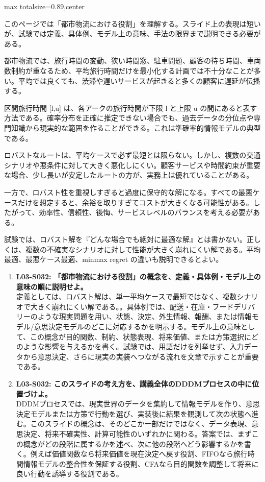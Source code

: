 \begin{minipage}[t]{0.58\textwidth}
\begin{adjustbox}{max totalsize={\textwidth}{0.89\textheight},center}
\begin{minipage}{\textwidth}\scriptsize
{}このページでは「都市物流における役割」を理解する。スライド上の表現は短いが、試験では定義、具体例、モデル上の意味、手法の限界まで説明できる必要がある。\par
都市物流では、旅行時間の変動、狭い時間窓、駐車問題、顧客の待ち時間、車両数制約が重なるため、平均旅行時間だけを最小化する計画では不十分なことが多い。平均では良くても、渋滞や遅いサービスが起きると多くの顧客に遅延が伝播する。\par
区間旅行時間 [l,u] は、各アークの旅行時間が下限 l と上限 u の間にあると表す方法である。確率分布を正確に推定できない場合でも、過去データの分位点や専門知識から現実的な範囲を作ることができる。これは準確率的情報モデルの典型である。\par
ロバストなルートは、平均ケースで必ず最短とは限らない。しかし、複数の交通シナリオや悪条件に対して大きく悪化しにくい。顧客サービスや時間約束が重要な場合、少し長いが安定したルートの方が、実務上は優れていることがある。\par
一方で、ロバスト性を重視しすぎると過度に保守的な解になる。すべての最悪ケースだけを想定すると、余裕を取りすぎてコストが大きくなる可能性がある。したがって、効率性、信頼性、後悔、サービスレベルのバランスを考える必要がある。\par
試験では、ロバスト解を『どんな場合でも絶対に最適な解』とは書かない。正しくは、複数の不確実なシナリオに対して性能が大きく崩れにくい解である。平均最適、最悪ケース最適、minmax regret の違いも説明できるとよい。\par{}\begin{enumerate}\item \textbf{L03-S032: 「都市物流における役割」の概念を、定義・具体例・モデル上の意味の順に説明せよ。}\\定義としては、ロバスト解は、単一平均ケースで最短ではなく、複数シナリオで大きく崩れにくい解である。。具体例では、配送・在庫・フードデリバリーのような現実問題を用い、状態、決定、外生情報、報酬、または情報モデル/意思決定モデルのどこに対応するかを明示する。モデル上の意味として、この概念が目的関数、制約、状態表現、将来価値、または方策選択にどのような影響を与えるかを書く。試験では、用語だけを列挙せず、入力データから意思決定、さらに現実の実装へつながる流れを文章で示すことが重要である。\item \textbf{L03-S032: このスライドの考え方を、講義全体のDDDMプロセスの中に位置づけよ。}\\DDDMプロセスでは、現実世界のデータを集約して情報モデルを作り、意思決定モデルまたは方策で行動を選び、実装後に結果を観測して次の状態へ進む。このスライドの概念は、そのどこか一部だけではなく、データ表現、意思決定、将来不確実性、計算可能性のいずれかに関わる。答案では、まずこの概念がどの段階に属するかを述べ、次に他の段階へどう影響するかを書く。例えば価値関数なら将来価値を現在決定へ戻す役割、FIFOなら旅行時間情報モデルの整合性を保証する役割、CFAなら目的関数を調整して将来に良い行動を誘導する役割である。\end{enumerate}

\end{minipage}
\end{adjustbox}
\end{minipage}
